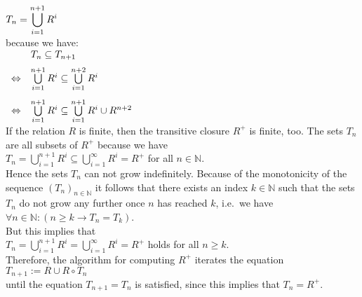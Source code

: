 \hspace*{1.3cm}
$\displaystyle T_n = \bigcup\limits_{i=1}^{n+1} R^i$ 
\\[0.2cm]
because we have:
\\[0.2cm]
\hspace*{1.3cm}
$
\begin{array}[t]{llcl}
                & T_n \subseteq T_{n+1} \\[0.2cm]
\Leftrightarrow & \bigcup\limits_{i=1}^{n+1} R^i \subseteq \bigcup\limits_{i=1}^{n+2} R^i \\[0.5cm]
\Leftrightarrow & \bigcup\limits_{i=1}^{n+1} R^i \subseteq \bigcup\limits_{i=1}^{n+1} R^i \cup R^{n+2} \\
\end{array}
$
\\[0.2cm]
If the relation  $R$ is finite, then the transitive closure $R^+$ is finite, too.  The sets $T_n$ 
are all subsets of $R^+$ because we have
\\[0.2cm]
\hspace*{1.3cm}
$T_n = \bigcup\limits_{i=1}^{n+1} R^i \subseteq \bigcup\limits_{i=1}^{\infty} R^i = R^+$ \quad for all $n \in \mathbb{N}$.
\\[0.2cm]
Hence the sets $T_n$ can not grow indefinitely.  Because of the monotonicity of the sequence 
$(T_n)_{n\in\mathbb{N}}$ it follows that there exists an index  $k \in \mathbb{N}$ such that the sets $T_n$ do
not grow any further once $n$ has reached $k$, i.e.~we have
\\[0.2cm]
\hspace*{1.3cm}
$\forall n \in \mathbb{N}:( n \geq k \rightarrow T_n = T_k)$.
\\[0.2cm]
But this implies that
\\[0.2cm]
\hspace*{1.3cm}
$T_n = \bigcup\limits_{i=1}^{n+1} R^i = \bigcup\limits_{i=1}^{\infty} R^i = R^+$ 
\quad holds for all $n \geq k$.
\\[0.2cm]
Therefore, the algorithm for computing  $R^+$ iterates the equation 
\\[0.2cm]
\hspace*{1.3cm}
$T_{n+1} := R \cup R \circ T_n$
\\[0.2cm]
until the equation  $T_{n+1} = T_n$ is satisfied, since this implies that $T_n = R^+$.


